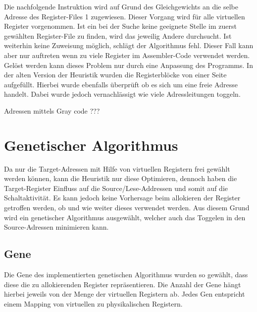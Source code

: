 Die nachfolgende Instruktion wird auf Grund des Gleichgewichts an die selbe Adresse des Register-Files 1 zugewiesen. Dieser Vorgang wird für alle virtuellen Register vorgenommen. Ist ein bei der Suche keine geeignete Stelle im zuerst gewählten Register-File zu finden, wird das jeweilig Andere durchsucht. Ist weiterhin keine Zuweisung möglich, schlägt der Algorithmus fehl. Dieser Fall kann aber nur auftreten wenn zu viele Register im Assembler-Code verwendet werden. Gelöst werden kann dieses Problem nur durch eine Anpassung des Programms.
In der alten Version der Heuristik wurden die Registerblöcke von einer Seite aufgefüllt. Hierbei wurde ebenfalls überprüft ob es sich um eine freie Adresse handelt. Dabei wurde jedoch vernachlässigt wie viele Adressleitungen toggeln. 

Adressen mittels Gray code ??? 

%	

\section{Genetischer Algorithmus}
\label{sec:genetischerAlgorithmus}
Da nur die Target-Adressen mit Hilfe von virtuellen Registern frei gewählt werden können, kann die Heuristik nur diese Optimieren, dennoch haben die Target-Register Einfluss auf die Source/Lese-Addressen und somit auf die Schaltaktivität. Es kann jedoch keine Vorhersage beim allokieren der Register getroffen werden, ob und wie weiter dieses verwendet werden. Aus diesem Grund wird ein genetischer Algorithmus ausgewählt, welcher auch das Toggelen in den Source-Adressen minimieren kann.

\subsection{Gene}
Die Gene des implementierten genetischen Algorithmus wurden so gewählt, dass diese die zu allokierenden Register repräsentieren. Die Anzahl der Gene hängt hierbei jeweils von der Menge der virtuellen Registern ab. Jedes Gen entspricht einem Mapping von virtuellen zu physikalischen Registern.

